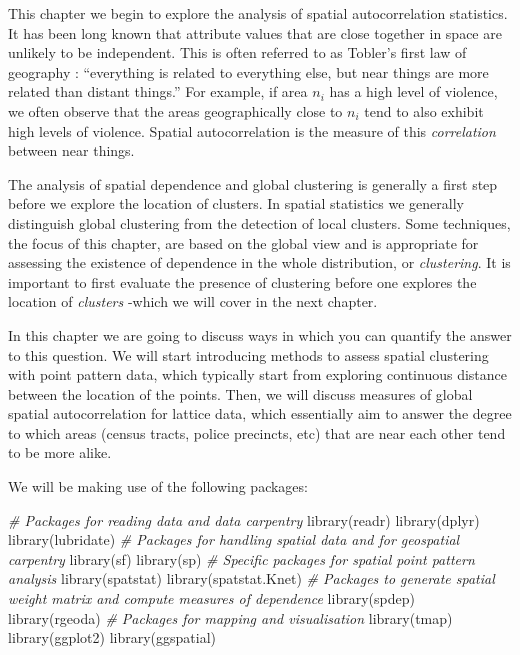 \documentclass[
  krantz2]{krantz}
\makeatletter
\newenvironment{Shaded}{\begin{snugshade}}{\end{snugshade}}
\newcommand{\CommentTok}[1]{\textcolor[rgb]{0.37,0.37,0.37}{\textit{#1}}}
\newcommand{\FunctionTok}[1]{\textcolor[rgb]{0,0,0}{#1}}
\newcommand{\NormalTok}[1]{#1}
\newenvironment{kframe}{%
\medskip{}
\setlength{\fboxsep}{.8em}
 \def\at@end@of@kframe{}%
 \ifinner\ifhmode%
  \def\at@end@of@kframe{\end{minipage}}%
  \begin{minipage}{\columnwidth}%
 \fi\fi%
 \def\FrameCommand##1{\hskip\@totalleftmargin \hskip-\fboxsep
 \colorbox{shadecolor}{##1}\hskip-\fboxsep
     \hskip-\linewidth \hskip-\@totalleftmargin \hskip\columnwidth}%
 \MakeFramed {\advance\hsize-\width
   \@totalleftmargin\z@ \linewidth\hsize
   \@setminipage}}%
 {\par\unskip\endMakeFramed%
 \at@end@of@kframe}
\renewenvironment{Shaded}{\begin{kframe}}{\end{kframe}}
\makeatother
\begin{document}
This chapter we begin to explore the analysis of spatial autocorrelation statistics. It has been long known that attribute values that are close together in space are unlikely to be independent. This is often referred to as Tobler's first law of geography : ``everything is related to everything else, but near things are more related than distant things.'' For example, if area \(n_i\) has a high level of violence, we often observe that the areas geographically close to \(n_i\) tend to also exhibit high levels of violence. Spatial autocorrelation is the measure of this \emph{correlation} between near things.

The analysis of spatial dependence and global clustering is generally a first step before we explore the location of clusters. In spatial statistics we generally distinguish global clustering from the detection of local clusters. Some techniques, the focus of this chapter, are based on the global view and is appropriate for assessing the existence of dependence in the whole distribution, or \emph{clustering}. It is important to first evaluate the presence of clustering before one explores the location of \emph{clusters} -which we will cover in the next chapter.

In this chapter we are going to discuss ways in which you can quantify the answer to this question. We will start introducing methods to assess spatial clustering with point pattern data, which typically start from exploring continuous distance between the location of the points. Then, we will discuss measures of global spatial autocorrelation for lattice data, which essentially aim to answer the degree to which areas (census tracts, police precincts, etc) that are near each other tend to be more alike.

We will be making use of the following packages:

\begin{Shaded}
\begin{Highlighting}[]
\CommentTok{\# Packages for reading data and data carpentry}
\FunctionTok{library}\NormalTok{(readr)}
\FunctionTok{library}\NormalTok{(dplyr)}
\FunctionTok{library}\NormalTok{(lubridate)}
\CommentTok{\# Packages for handling spatial data and for geospatial carpentry}
\FunctionTok{library}\NormalTok{(sf)}
\FunctionTok{library}\NormalTok{(sp)}
\CommentTok{\# Specific packages for spatial point pattern analysis}
\FunctionTok{library}\NormalTok{(spatstat)}
\FunctionTok{library}\NormalTok{(spatstat.Knet)}
\CommentTok{\# Packages to generate spatial weight matrix and compute measures of dependence}
\FunctionTok{library}\NormalTok{(spdep)}
\FunctionTok{library}\NormalTok{(rgeoda)}
\CommentTok{\# Packages for mapping and visualisation}
\FunctionTok{library}\NormalTok{(tmap)}
\FunctionTok{library}\NormalTok{(ggplot2)}
\FunctionTok{library}\NormalTok{(ggspatial)}
\end{Highlighting}
\end{Shaded}
\end{document}

